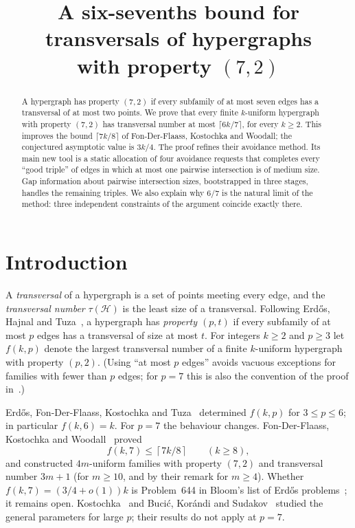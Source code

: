 \documentclass[11pt]{article}
\title{A six-sevenths bound for transversals of hypergraphs\\ with property $(7,2)$}
\author{}
\date{}
\numberwithin{equation}{section}
\theoremstyle{definition}
\theoremstyle{remark}
\newcommand{\HH}{\mathcal H}
\newcommand{\ceil}[1]{\left\lceil #1\right\rceil}
\begin{document}
\maketitle

\begin{abstract}
A hypergraph has property $(7,2)$ if every subfamily of at most seven
edges has a transversal of at most two points. We prove that every
finite $k$-uniform hypergraph with property $(7,2)$ has transversal
number at most $\lceil 6k/7\rceil$, for every $k\ge2$. This improves the
bound $\lceil 7k/8\rceil$ of Fon-Der-Flaass, Kostochka and Woodall; the
conjectured asymptotic value is $3k/4$. The proof refines their
avoidance method. Its main new tool is a static allocation of
four avoidance requests that completes every ``good triple'' of edges
in which at most one pairwise intersection is of medium size. Gap
information about pairwise intersection sizes, bootstrapped in three
stages, handles the remaining triples. We also explain why $6/7$ is the natural
limit of the method: three independent constraints of the argument
coincide exactly there.
\end{abstract}

\section{Introduction}\label{sec:intro}

A \emph{transversal} of a hypergraph is a set of points meeting every
edge, and the \emph{transversal number} $\tau(\HH)$ is the least size
of a transversal. Following Erd\H{o}s, Hajnal and Tuza~\cite{EHT}, a
hypergraph has \emph{property $(p,t)$} if every subfamily of at most $p$
edges has a transversal of size at most $t$. For integers $k\ge2$ and
$p\ge3$ let $f(k,p)$ denote the largest transversal number of a finite
$k$-uniform hypergraph with property $(p,2)$. (Using ``at most $p$
edges'' avoids vacuous exceptions for families with fewer than $p$
edges; for $p=7$ this is also the convention of the proof
in~\cite{FKW}.)

Erd\H{o}s, Fon-Der-Flaass, Kostochka and Tuza~\cite{EFKT} determined
$f(k,p)$ for $3\le p\le6$; in particular $f(k,6)=k$. For $p=7$ the
behaviour changes. Fon-Der-Flaass, Kostochka and Woodall~\cite{FKW}
proved
\[
 f(k,7)\le\ceil{7k/8}\qquad(k\ge8),
\]
and constructed $4m$-uniform families with property $(7,2)$ and
transversal number $3m+1$ (for $m\ge10$, and by their remark for $m\ge4$).
Whether $f(k,7)=(3/4+o(1))k$ is Problem~644 in Bloom's list of Erd\H{o}s
problems~\cite{Bloom}; it remains open. Kostochka~\cite{Kostochka} and
Buci\'c, Kor\'andi and Sudakov~\cite{BKS} studied the general parameters
for large $p$; their results do not apply at $p=7$.
\end{document}
